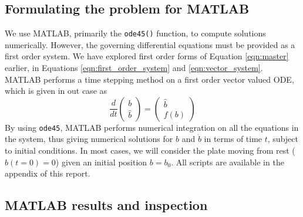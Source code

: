 \subsection{Formulating the problem for MATLAB}

We use MATLAB, primarily the \texttt{ode45()} function, to compute solutions numerically.
However, the governing differential equations must be provided as a first order system.
We have explored first order forms of Equation \ref{eqn:master} earlier,
in Equations \ref{eqn:first_order_system} and \ref{eqn:vector_system}.
MATLAB performs a time stepping method on a first order vector valued ODE,
which is given in out case as
\begin{equation*}
	\frac{d}{dt}\begin{pmatrix}
		b \\
		\hat{b}
	\end{pmatrix} = \begin{pmatrix}
		\hat{b} \\
		f(b)	
	\end{pmatrix}
\end{equation*}
By using \texttt{ode45}, MATLAB performs numerical integration on all the equations in the system,
thus giving numerical solutions for $b$ and $\dot{b}$ in terms of time $t$, subject to initial conditions.
In most cases, we will consider the plate moving from rest ($\hat{b}(t=0) = 0$) given an initial position $b=b_0$.
All scripts are available in the appendix of this report.

\subsection{MATLAB results and inspection}

